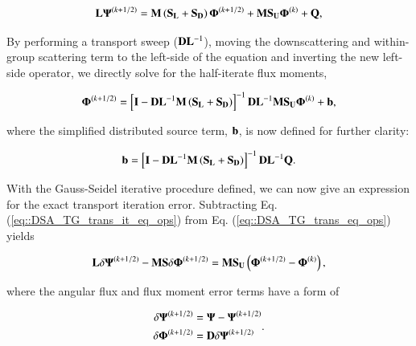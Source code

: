 \documentclass[preprint,10pt]{elsarticle}
\begin{document}
\begin{equation}
\label{eq::DSA_TG_trans_it_eq_ops}
{\bf L} {\bf \Psi}^{(k+1/2)} = {\bf M} \left(  {\bf S_L} + {\bf S_D} \right) {\bf \Phi}^{(k+1/2)} + {\bf M} {\bf S_U} {\bf \Phi}^{(k)} + {\bf Q} ,
\end{equation}

\noindent By performing a transport sweep (${\bf D}{\bf L}^{-1}$), moving the downscattering and within-group scattering term to the left-side of the equation and inverting the new left-side operator, we directly solve for the half-iterate flux moments,

\begin{equation}
\label{eq::DSA_TG_half_it_sol}
{\bf \Phi}^{(k+1/2)} = \left[ {\bf I} - {\bf D}{\bf L}^{-1} {\bf M} \left(  {\bf S_L} + {\bf S_D} \right) \right]^{-1} {\bf D}{\bf L}^{-1}  {\bf M} {\bf S_U} {\bf \Phi}^{(k)} + {\bf b} ,
\end{equation}

\noindent where the simplified distributed source term, ${\bf b}$, is now defined for further clarity:

\begin{equation}
\label{eq::DSA_TG_half_it_forcingfunc}
{\bf b} = \left[ {\bf I} - {\bf D}{\bf L}^{-1} {\bf M} \left(  {\bf S_L} + {\bf S_D} \right) \right]^{-1} {\bf D}{\bf L}^{-1}  {\bf Q} .
\end{equation}


With the Gauss-Seidel iterative procedure defined, we can now give an expression for the exact transport iteration error. Subtracting Eq. (\ref{eq::DSA_TG_trans_it_eq_ops}) from Eq. (\ref{eq::DSA_TG_trans_eq_ops}) yields

\begin{equation}
\label{eq::DSA_TG_trans_err_wres_op}
{\bf L} \delta {\bf \Psi}^{(k+1/2)} - {\bf M}   {\bf S} \delta {\bf \Phi}^{(k+1/2)} = {\bf M} {\bf S_U}  \left( {\bf \Phi}^{(k+1/2)} - {\bf \Phi}^{(k)} \right),
\end{equation}

\noindent where the angular flux and flux moment error terms have a form of

\begin{equation}
\label{eq::DSA_TG_error_terms}
\begin{aligned}
\delta {\bf \Psi}^{(k+1/2)} &= {\bf \Psi} - {\bf \Psi}^{(k+1/2)} \\
\delta {\bf \Phi}^{(k+1/2)} &= {\bf D} \delta {\bf \Psi}^{(k+1/2)}
\end{aligned} .
\end{equation}
\end{document}
